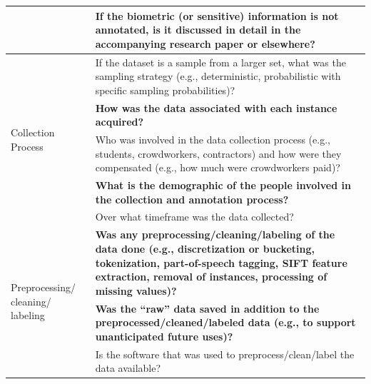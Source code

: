 \documentclass[journal]{IEEEtran}
\begin{document}
\begin{table}[]
\begin{tabular}{|p{}|p{}|}
                                                 & \textbf{If the biometric (or sensitive) information is not annotated, is it discussed in detail in the accompanying research paper or elsewhere?}                                                                         \\ \hline
\multirow{5}{2cm}{Collection Process}              & If the dataset is a sample from a larger set, what was the sampling strategy (e.g., deterministic, probabilistic with specific sampling probabilities)?                                                                   \\
                                                 & \textbf{How was the data associated with each instance acquired?}                                                                                                                                                         \\
                                                 & Who was involved in the data collection process (e.g., students, crowdworkers, contractors) and how were they compensated (e.g., how much were crowdworkers paid)?                                                        \\
                                                 & \textbf{What is the demographic of the people involved in the collection and annotation process?}                                                                                                                         \\
                                                 & Over what timeframe was the data collected?                                                                                                                                                                               \\ \hline
\multirow{3}{2cm}{Preprocessing/ cleaning/ labeling} & \textbf{Was any preprocessing/cleaning/labeling of the data done (e.g., discretization or bucketing, tokenization, part-of-speech tagging, SIFT feature extraction, removal of instances, processing of missing values)?} \\
                                                 & \textbf{Was the “raw” data saved in addition to the preprocessed/cleaned/labeled data (e.g., to support unanticipated future uses)?}                                                                                      \\
                                                 & Is the software that was used to preprocess/clean/label the data available?                                                                                                                                               \\ \hline

\end{tabular}
\end{table}
\end{document}
